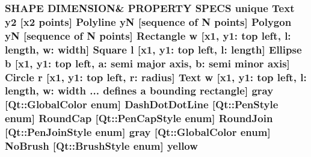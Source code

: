 \subsubsection[{\texorpdfstring{yellow}{yellow}}]{\setlength{\rightskip}{0pt plus 5cm}S\+H\+A\+PE D\+I\+M\+E\+N\+S\+I\+ON\& P\+R\+O\+P\+E\+R\+TY S\+P\+E\+CS unique {\bf Text} {\bf y2} \mbox{[}{\bf x2} points\mbox{]} {\bf Polyline} yN \mbox{[}sequence of N points\mbox{]} {\bf Polygon} yN \mbox{[}sequence of N points\mbox{]} {\bf Rectangle} w \mbox{[}{\bf x1}, y1\+: top left, l\+: length, w\+: width\mbox{]} {\bf Square} {\bf l} \mbox{[}{\bf x1}, y1\+: top left, l\+: length\mbox{]} {\bf Ellipse} b \mbox{[}{\bf x1}, y1\+: top left, a\+: semi major axis, b\+: semi minor axis\mbox{]} {\bf Circle} r \mbox{[}{\bf x1}, y1\+: top left, r\+: radius\mbox{]} {\bf Text} w \mbox{[}{\bf x1}, y1\+: top left, l\+: length, w\+: width ... defines {\bf a} bounding rectangle\mbox{]} gray \mbox{[}Qt\+::\+Global\+Color enum\mbox{]} Dash\+Dot\+Dot\+Line \mbox{[}Qt\+::\+Pen\+Style enum\mbox{]} Round\+Cap \mbox{[}{\bf Qt\+::\+Pen\+Cap\+Style} enum\mbox{]} Round\+Join \mbox{[}{\bf Qt\+::\+Pen\+Join\+Style} enum\mbox{]} gray \mbox{[}Qt\+::\+Global\+Color enum\mbox{]} No\+Brush \mbox{[}{\bf Qt\+::\+Brush\+Style} enum\mbox{]} yellow}\hypertarget{shape__input__file__specs_8txt_a3420c3b88f0e5d261e62e78f08802981}{}\label{shape__input__file__specs_8txt_a3420c3b88f0e5d261e62e78f08802981}
